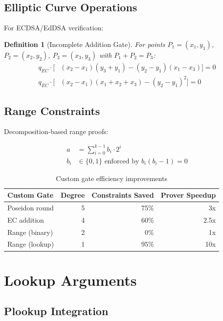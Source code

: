 \documentclass[11pt,a4paper]{article}
\newtheorem{definition}[theorem]{Definition}
\begin{document}
\subsection{Elliptic Curve Operations}

For ECDSA/EdDSA verification:

\begin{definition}[Incomplete Addition Gate]
For points $P_1 = (x_1, y_1)$, $P_2 = (x_2, y_2)$, $P_3 = (x_3, y_3)$ with $P_1 + P_2 = P_3$:
\begin{align*}
q_{EC} \cdot \big[ & (x_2 - x_1)(y_3 + y_1) - (y_2 - y_1)(x_1 - x_3) \big] = 0 \\
q_{EC} \cdot \big[ & (x_2 - x_1)(x_1 + x_2 + x_3) - (y_2 - y_1)^2 \big] = 0
\end{align*}
\end{definition}

\subsection{Range Constraints}

Decomposition-based range proofs:

\begin{align*}
a &= \sum_{i=0}^{k-1} b_i \cdot 2^i \\
b_i &\in \{0, 1\} \text{ enforced by } b_i(b_i - 1) = 0
\end{align*}

\begin{table}[h]
\centering
\begin{tabular}{lrrr}
\toprule
\textbf{Custom Gate} & \textbf{Degree} & \textbf{Constraints Saved} & \textbf{Prover Speedup} \\
\midrule
Poseidon round & 5 & 75\% & 3x \\
EC addition & 4 & 60\% & 2.5x \\
Range (binary) & 2 & 0\% & 1x \\
Range (lookup) & 1 & 95\% & 10x \\
\bottomrule
\end{tabular}
\caption{Custom gate efficiency improvements}
\label{tab:custom-gates}
\end{table}

\section{Lookup Arguments}
\label{sec:lookups}

\subsection{Plookup Integration}
\end{document}
